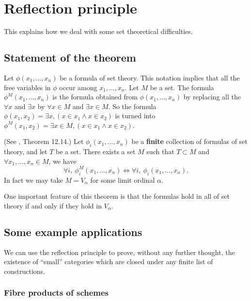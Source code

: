 \section{Reflection principle}
\label{section-reflection-principle}

\noindent
This explains how we deal with some
set theoretical difficulties. 

\subsection{Statement of the theorem}
\label{subsection-reflection-theorem}

\noindent
Let $\phi(x_1,\ldots,x_n)$ be a formula of set theory.
This notation implies that all the free variables in $\phi$
occur among $x_1,\ldots,x_n$. Let $M$ be a set.
The formula $\phi^M(x_1,\ldots,x_n)$ is the formula obtained 
from $\phi(x_1,\ldots,x_n)$ by replacing all the
$\forall x$ and $\exists x$ by $\forall x\in M$ and $\exists x\in M$.
So the formula
$\phi(x_1,x_2) = \exists x, (x\in x_1 \wedge x\in x_2)$
is turned  into
$\phi^M(x_1,x_2) = \exists x \in M, (x\in x_1 \wedge x\in x_2)$.

\begin{theorem}
\label{theorem-reflection-principle}
(See \cite{Jech}, Theorem 12.14.)
Let $\phi_i(x_1,\ldots,x_n)$ be a {\bf finite} collection of
formulas of set theory, and let $T$ be a set.
There exists a set $M$ such that
$T \subset M$ and
$\forall x_1,\ldots,x_n \in M$, we have
$$
\forall i,\  
\phi_i^{M}(x_1,\ldots,x_n)
\Leftrightarrow
\forall i,\  
\phi_i(x_1,\ldots,x_n).
$$
In fact we may take $M = V_\alpha$ for some limit ordinal $\alpha$.
\end{theorem}

\noindent
One important feature of this theorem is that the
formulas hold in all of set theory if and only if they
hold in $V_\alpha$.

\subsection{Some example applications}
\label{example-reflection-principle}

\noindent
We can use the reflection principle to
prove, without any further thought, the 
existence of ``small'' categories which are
closed under any finite list of constructions.

\subsubsection{Fibre products of schemes}

